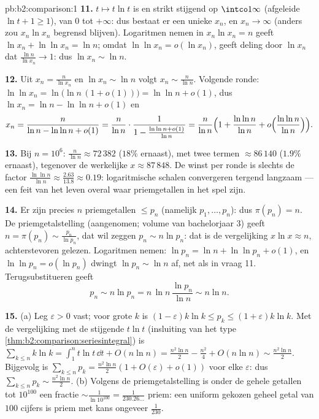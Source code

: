 \begin{solution}{pb:b2:comparison:1}
\textbf{11.} $t \mapsto t\ln t$ is  en strikt stijgend op
$\intco1\infty$ (afgeleide $\ln t + 1 \geq 1$), van $0$ tot
$+\infty$: dus bestaat er een unieke $x_n$, en $x_n \to \infty$
(anders zou $x_n\ln x_n$ begrensd blijven). Logaritmen nemen in
$x_n\ln x_n = n$ geeft $\ln x_n + \ln\ln x_n = \ln n$; omdat
$\ln\ln x_n = o(\ln x_n)$, geeft deling door $\ln x_n$ dat
$\frac{\ln n}{\ln x_n} \to 1$: dus $\ln x_n \sim \ln n$.

\textbf{12.} Uit $x_n = \frac{n}{\ln x_n}$ en $\ln x_n \sim \ln n$
volgt $x_n \sim \frac{n}{\ln n}$. Volgende ronde: $\ln\ln x_n =
\ln\bigl(\ln n\,(1 + o(1))\bigr) = \ln\ln n + o(1)$, dus $\ln x_n =
\ln n - \ln\ln n + o(1)$ en
\[
x_n = \frac{n}{\ln n - \ln\ln n + o(1)}
= \frac{n}{\ln n}\cdot\frac{1}{1 - \frac{\ln\ln n +
o(1)}{\ln n}}
= \frac{n}{\ln n}\Bigl(1 + \frac{\ln\ln n}{\ln n} +
o\Bigl(\frac{\ln\ln n}{\ln n}\Bigr)\Bigr).
\]

\textbf{13.} Bij $n = 10^6$: $\frac{n}{\ln n} \approx 72\,382$
($18\%$ ernaast), met twee termen $\approx 86\,140$ ($1.9\%$
ernaast), tegenover de werkelijke $x \approx 87\,848$. De winst per
ronde is slechts de factor $\frac{\ln\ln n}{\ln n} \approx
\frac{2.63}{13.8} \approx 0.19$: logaritmische schalen convergeren
tergend langzaam --- een feit van het leven overal waar
priemgetallen in het spel zijn.

\textbf{14.} Er zijn precies $n$ priemgetallen $\leq p_n$ (namelijk
$p_1, \dots, p_n$): dus $\pi(p_n) = n$. De priemgetalstelling
(aangenomen; volume van bachelorjaar 3) geeft $n = \pi(p_n) \sim
\frac{p_n}{\ln p_n}$, dat wil zeggen $p_n \sim n\ln p_n$: dat is de
vergelijking $x\ln x \approx n$, achterstevoren gelezen. Logaritmen
nemen: $\ln p_n = \ln n + \ln\ln p_n + o(1)$, en $\ln\ln p_n =
o(\ln p_n)$ dwingt $\ln p_n \sim \ln n$ af, net als in vraag 11.
Terugsubstitueren geeft
\[
p_n \sim n\ln p_n = n\,\ln n\,\frac{\ln p_n}{\ln n} \sim n\ln
n .
\]

\textbf{15.} (a) Leg $\varepsilon > 0$ vast; voor grote $k$ is $(1
- \varepsilon)k\ln k \leq p_k \leq (1 + \varepsilon)k\ln k$. Met
de vergelijking met de stijgende $t\ln t$ (insluiting van het type
\cref{thm:b2:comparison:seriesintegral}) is $\sum_{k\leq n}k\ln k =
\int_1^n t\ln t\,\dd t + O(n\ln n) = \frac{n^2\ln n}2 -
\frac{n^2}4 + O(n\ln n) \sim \frac{n^2\ln n}2$. Bijgevolg is
$\sum_{k\leq n}p_k = \frac{n^2\ln n}{2}(1 + O(\varepsilon) +
o(1))$ voor elke $\varepsilon$: dus $\sum_{k\leq n}p_k \sim
\frac{n^2\ln n}2$. (b) Volgens de priemgetalstelling is onder de
gehele getallen tot $10^{100}$ een fractie $\sim \frac{1}{\ln
10^{100}} = \frac1{230.26\dots}$ priem: een uniform gekozen geheel
getal van $100$ cijfers is priem met kans ongeveer
$\frac1{230}$.


\end{solution}
